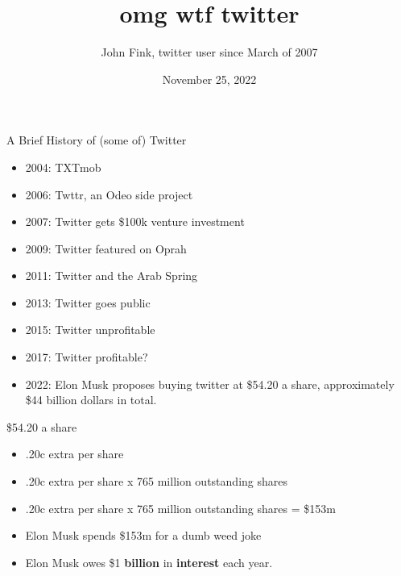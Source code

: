 \documentclass{beamer}
\title{omg wtf twitter}
\author{John Fink, twitter user since March of 2007}
\date{November 25, 2022}
\begin{document}
\begin{frame}[plain]
    \maketitle
\end{frame}
\begin{frame}{A Brief History of (some of) Twitter}
	\begin{itemize}
		\pause
		\item 2004: TXTmob
		\pause
		\item 2006: Twttr, an Odeo side project
		\pause
		\item 2007: Twitter gets \$100k venture investment
		\pause
		\item 2009: Twitter featured on Oprah
		\pause
		\item 2011: Twitter and the Arab Spring
		\pause
		\item 2013: Twitter goes public
		\pause 
		\item 2015: Twitter unprofitable
		\pause
		\item 2017: Twitter profitable?
		\pause
		\item 2022: Elon Musk proposes buying twitter at \$54.20 a share, approximately \$44 billion dollars in total.
	\end{itemize}
\end{frame}

\begin{frame}{\$54.20 a share}
	\begin{itemize}
		\pause
		\item .20c extra per share
		\pause
		\item .20c extra per share x 765 million outstanding shares
		\pause
		\item .20c extra per share x 765 million outstanding shares = \$153m
		\pause
		\item Elon Musk spends \$153m for a dumb weed joke
		\pause 
		\item Elon Musk owes \$1 \textbf{billion} in \textbf{interest} each year.
	\end{itemize}	
\end{frame}
\end{document}
